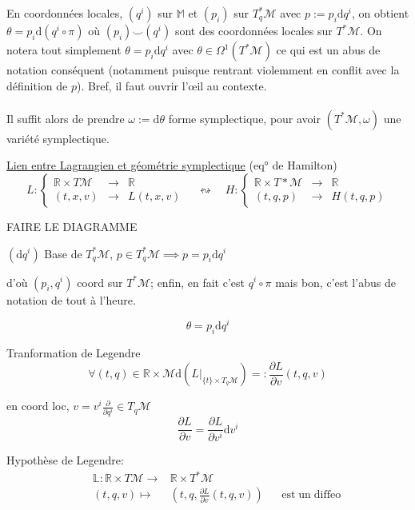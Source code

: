\documentclass[a4paper,11pt]{article}
\renewcommand{\d}{{\mathrm{d}}}
\newcommand{\dr}[2]{\frac{\partial {#1}}{\partial{#2}}}
\begin{document}
En coordonnées locales, $(q^i)$ sur $\mathbb{M}$ et $(p_i)$ sur $T_q^*\mathcal{M}$ avec $p := p_i \d q^i$, on obtient $\theta = p_i \d \left(q^i\circ \pi\right)$ où $(p_i)\!\!\smile\!\!(q^i)$ sont des coordonnées locales sur $T^*\mathcal{M}$. On notera tout simplement $\theta = p_i\d q^i$ avec $\theta \in \Omega^1(T^*\mathcal{M})$
ce qui est un abus de notation conséquent (notamment puisque rentrant violemment en conflit avec la définition de $p$). Bref, il faut ouvrir l'œil au contexte.\\
\\
Il suffit alors de prendre $\omega := \d \theta$ forme symplectique, pour avoir $(T^*\mathcal{M},\omega)$ une variété symplectique.

\noindent \underline{Lien entre Lagrangien et géométrie symplectique} (eq° de Hamilton)\\

\begin{equation*}
L: \left\{ \begin{matrix}
\mathbb{R}\times T \mathcal{M} & \to & \mathbb{R}\\
(t,x,v) & \to & L(t,x,v)
\end{matrix}\right.
\quad \leftrightsquigarrow \quad H:\left\{\begin{matrix}
\mathbb{R}\times T* \mathcal{M} & \to & \mathbb{R}\\
(t,q,p) & \to & H(t,q,p)
\end{matrix}\right.
\end{equation*}


FAIRE LE DIAGRAMME

$(\d q^i)$ Base de $T_q^*\mathcal{M}$, $p\in T^*_q\mathcal{M} \implies p=p_i\d q^i$

d'où $(p_i, q^i)$ coord sur $T^*\mathcal{M}$; enfin, en fait c'est $q^i\circ \pi$ mais bon, c'est l'abus de notation de tout à l'heure.

$$\theta = p_i\d q^i$$

Tranformation de Legendre
$$\forall (t,q) \in \mathbb{R}\times\mathcal{M} \d (L|_{\{t\}\times T_q\mathcal{M}}) =: \dr{L}{v}(t,q,v)$$

en coord loc, $v=v^i\frac{\partial}{\partial q^i} \in T_q\mathcal{M}$
$$\dr{L}{v} = \dr{L}{v^i} \d v^i$$

Hypothèse de Legendre: 
\begin{align*}
&&\mathbb{L}: \mathbb{R}\times T\mathcal{M} \to & \mathbb{R}\times T^*\mathcal{M}\\
&&(t,q,v)\mapsto & (t,q, \dr{L}{v}(t,q,v)) &&
\mathrm{est}\; \mathrm{un}\; \mathrm{diffeo}
\end{align*}
\end{document}

